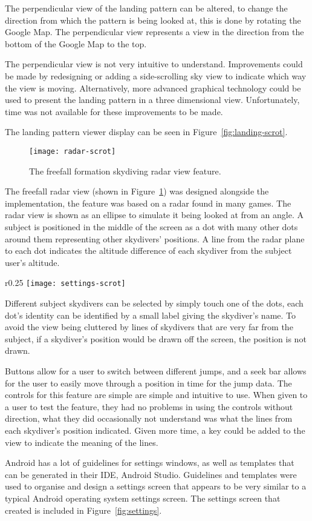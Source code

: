 The perpendicular view of the landing pattern can be altered, to change the direction from which the pattern is being looked at, this is done by rotating the Google Map. The perpendicular view represents a view in the direction from the bottom of the Google Map to the top.

The perpendicular view is not very intuitive to understand. Improvements could be made by redesigning or adding a side-scrolling sky view to indicate which way the view is moving. Alternatively, more advanced graphical technology could be used to present the landing pattern in a three dimensional view. Unfortunately, time was not available for these improvements to be made.

The landing pattern viewer display can be seen in Figure~\ref{fig:landing-scrot}.

\begin{figure}[!t]
  \centering
  \texttt{[image: radar-scrot]}
  \caption{The freefall formation skydiving radar view feature.}\label{fig:radar}
\end{figure}

The freefall radar view (shown in Figure~\ref{fig:radar}) was designed alongside the implementation, the feature was based on a radar found in many games. The radar view is shown as an ellipse to simulate it being looked at from an angle. A subject is positioned in the middle of the screen as a dot with many other dots around them representing other skydivers' positions. A line from the radar plane to each dot indicates the altitude difference of each skydiver from the subject user's altitude.

\begin{wrapfigure}{r}{0.25\textwidth}
  \centering
  \texttt{[image: settings-scrot]}
  \caption{The settings screen for the app.}\label{fig:settings}
\end{wrapfigure}

Different subject skydivers can be selected by simply touch one of the dots, each dot's identity can be identified by a small label giving the skydiver's name. To avoid the view being cluttered by lines of skydivers that are very far from the subject, if a skydiver's position would be drawn off the screen, the position is not drawn.

Buttons allow for a user to switch between different jumps, and a seek bar allows for the user to easily move through a position in time for the jump data. The controls for this feature are simple are simple and intuitive to use. When given to a user to test the feature, they had no problems in using the controls without direction, what they did occasionally not understand was what the lines from each skydiver's position indicated. Given more time, a key could be added to the view to indicate the meaning of the lines.

Android has a lot of guidelines for settings windows, as well as templates that can be generated in their IDE, Android Studio. Guidelines and templates were used to organise and design a settings screen that appears to be very similar to a typical Android operating system settings screen.
The settings screen that created is included in Figure~\ref{fig:settings}.
